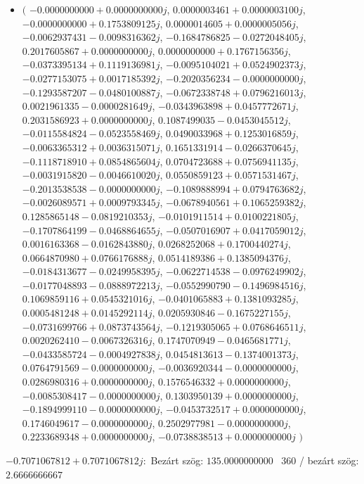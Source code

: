 \documentclass[14pt,a4paper]{article}
\begin{document}
\begin{itemize}
\item
$\big($
$-0.0000000000+0.0000000000j$, $0.0000003461+0.0000003100j$, $-0.0000000000+0.1753809125j$, $0.0000014605+0.0000005056j$, $-0.0062937431-0.0098316362j$, $-0.1684786825-0.0272048405j$, $0.2017605867+0.0000000000j$, $0.0000000000+0.1767156356j$, $-0.0373395134+0.1119136981j$, $-0.0095104021+0.0524902373j$, $-0.0277153075+0.0017185392j$, $-0.2020356234-0.0000000000j$, $-0.1293587207-0.0480100887j$, $-0.0672338748+0.0796216013j$, $0.0021961335-0.0000281649j$, $-0.0343963898+0.0457772671j$, $0.2031586923+0.0000000000j$, $0.1087499035-0.0453045512j$, $-0.0115584824-0.0523558469j$, $0.0490033968+0.1253016859j$, $-0.0063365312+0.0036315071j$, $0.1651331914-0.0266370645j$, $-0.1118718910+0.0854865604j$, $0.0704723688+0.0756941135j$, $-0.0031915820-0.0046610020j$, $0.0550859123+0.0571531467j$, $-0.2013538538-0.0000000000j$, $-0.1089888994+0.0794763682j$, $-0.0026089571+0.0009793345j$, $-0.0678940561+0.1065259382j$, $0.1285865148-0.0819210353j$, $-0.0101911514+0.0100221805j$, $-0.1707864199-0.0468864655j$, $-0.0507016907+0.0417059012j$, $0.0016163368-0.0162843880j$, $0.0268252068+0.1700440274j$, $0.0664870980+0.0766176888j$, $0.0514189386+0.1385094376j$, $-0.0184313677-0.0249958395j$, $-0.0622714538-0.0976249902j$, $-0.0177048893-0.0888972213j$, $-0.0552990790-0.1496984516j$, $0.1069859116+0.0545321016j$, $-0.0401065883+0.1381093285j$, $0.0005481248+0.0145292114j$, $0.0205930846-0.1675227155j$, $-0.0731699766+0.0873743564j$, $-0.1219305065+0.0768646511j$, $0.0020262410-0.0067326316j$, $0.1747070949-0.0465681771j$, $-0.0433585724-0.0004927838j$, $0.0454813613-0.1374001373j$, $0.0764791569-0.0000000000j$, $-0.0036920344-0.0000000000j$, $0.0286980316+0.0000000000j$, $0.1576546332+0.0000000000j$, $-0.0085308417-0.0000000000j$, $0.1303950139+0.0000000000j$, $-0.1894999110-0.0000000000j$, $-0.0453732517+0.0000000000j$, $0.1746049617-0.0000000000j$, $0.2502977981-0.0000000000j$, $0.2233689348+0.0000000000j$, $-0.0738838513+0.0000000000j$
$\big)$
\end{itemize}
$-0.7071067812+0.7071067812j$:\
Bezárt szög: $135.0000000000$ \
360 / bezárt szög: $2.6666666667$\
\end{document}
